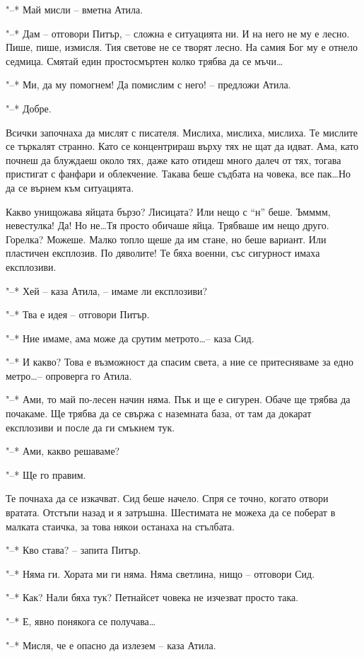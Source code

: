 \documentclass[ebook,openany,12pt]{memoir}
\begin{document}
"--* Май мисли – вметна Атила.

"--* Дам -- отговори Питър, – сложна е ситуацията ни. И на него не му е лесно. Пише, пише, измисля. Тия светове не се творят лесно. На самия Бог му е отнело седмица. Смятай един простосмъртен колко трябва да се мъчи\ldots

"--* Ми, да му помогнем! Да помислим с него! – предложи Атила.

"--* Добре.

Всички започнаха да мислят с писателя. Мислиха, мислиха, мислиха. Те мислите се търкалят странно. Като се концентрираш върху тях не щат да идват. Ама, като почнеш да блуждаеш около тях, даже като отидеш много далеч от тях, тогава пристигат с фанфари и облекчение. Такава беше съдбата на човека, все пак\ldots Но да се върнем към ситуацията.

Какво унищожава яйцата бързо? Лисицата? Или нещо с ``н'' беше. Ъмммм, невестулка! Да! Но не\ldots Тя просто обичаше яйца. Трябваше им нещо друго. Горелка? Можеше. Малко топло щеше да им стане, но беше вариант. Или пластичен експлозив. По дяволите! Те бяха военни, със сигурност имаха експлозиви. 

"--* Хей -- каза Атила, – имаме ли експлозиви?

"--* Тва е идея – отговори Питър.

"--* Ние имаме, ама може да срутим метрото\ldots -- каза Сид.

"--* И какво? Това е възможност да спасим света, а ние се притесняваме за едно метро\ldots -- опроверга го Атила.

"--* Ами, то май по-лесен начин няма. Пък и ще е сигурен. Обаче ще трябва да почакаме. Ще трябва да се свържа с наземната база, от там да докарат експлозиви и после да ги смъкнем тук.

"--* Ами, какво решаваме?

"--* Ще го правим.

Те почнаха да се изкачват. Сид беше начело. Спря се точно, когато отвори вратата. Отстъпи назад и я затръшна. Шестимата не можеха да се поберат в малката стаичка, за това някои останаха на стълбата.

"--* Кво става? – запита Питър.

"--* Няма ги. Хората ми ги няма. Няма светлина, нищо – отговори Сид.

"--* Как? Нали бяха тук? Петнайсет човека не изчезват просто така.

"--* Е, явно понякога се получава\ldots

"--* Мисля, че е опасно да излезем – каза Атила.
\end{document}
